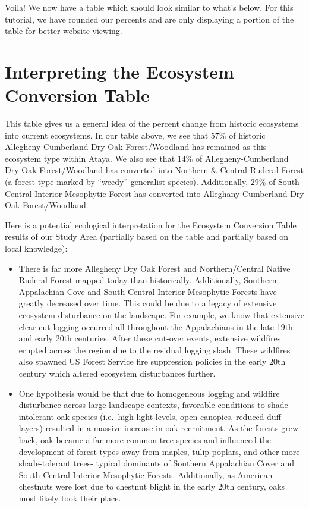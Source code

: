 \documentclass[
]{book}
\providecommand{\tightlist}{%
  \setlength{\itemsep}{0pt}\setlength{\parskip}{0pt}}
\begin{document}
Voila! We now have a table which should look similar to what's below. For this tutorial, we have rounded our percents and are only displaying a portion of the table for better website viewing.

\hypertarget{interpreting-the-ecosystem-conversion-table}{%
\section{Interpreting the Ecosystem Conversion Table}\label{interpreting-the-ecosystem-conversion-table}}

This table gives us a general idea of the percent change from historic ecosystems into current ecosystems. In our table above, we see that 57\% of historic Allegheny-Cumberland Dry Oak Forest/Woodland has remained as this ecosystem type within Ataya. We also see that 14\% of Allegheny-Cumberland Dry Oak Forest/Woodland has converted into Northern \& Central Ruderal Forest (a forest type marked by ``weedy'' generalist species). Additionally, 29\% of South-Central Interior Mesophytic Forest has converted into Alleghany-Cumberland Dry Oak Forest/Woodland.

Here is a potential ecological interpretation for the Ecosystem Conversion Table results of our Study Area (partially based on the table and partially based on local knowledge):

\begin{itemize}
\tightlist
\item
  There is far more Allegheny Dry Oak Forest and Northern/Central Native Ruderal Forest mapped today than historically. Additionally, Southern Appalachian Cove and South-Central Interior Mesophytic Forests have greatly decreased over time. This could be due to a legacy of extensive ecosystem disturbance on the landscape. For example, we know that extensive clear-cut logging occurred all throughout the Appalachians in the late 19th and early 20th centuries. After these cut-over events, extensive wildfires erupted across the region due to the residual logging slash. These wildfires also spawned US Forest Service fire suppression policies in the early 20th century which altered ecosystem disturbances further.
\item
  One hypothesis would be that due to homogeneous logging and wildfire disturbance across large landscape contexts, favorable conditions to shade-intolerant oak species (i.e.~high light levels, open canopies, reduced duff layers) resulted in a massive increase in oak recruitment. As the forests grew back, oak became a far more common tree species and influenced the development of forest types away from maples, tulip-poplars, and other more shade-tolerant trees- typical dominants of Southern Appalachian Cover and South-Central Interior Mesophytic Forests. Additionally, as American chestnuts were lost due to chestnut blight in the early 20th century, oaks most likely took their place.
\end{itemize}
\end{document}
